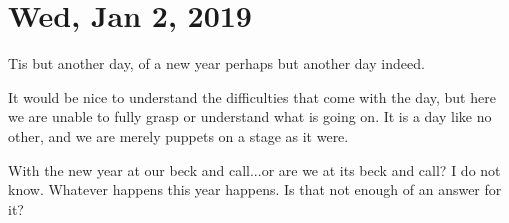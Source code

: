 \section{Wed, Jan 2, 2019}

Tis but another day, of a new year perhaps but another day indeed.

It would be nice to understand the difficulties that come with the day, but here we
are unable to fully grasp or understand what is going on. It is a day like no other,
and we are merely puppets on a stage as it were.

With the new year at our beck and call...or are we at its beck and call? I do not
know. Whatever happens this year happens. Is that not enough of an answer for it?
